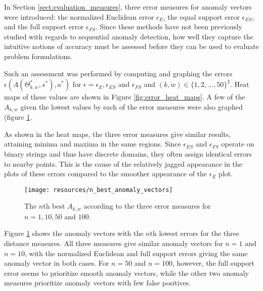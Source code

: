 In Section \ref{sect:evaluation_measures}, three error measures for anomaly vectors were introduced: the normalized Euclidean error $\epsilon_E$, the equal support error $\epsilon_{ES}$, and the full support error $\epsilon_{FS}$. Since these methods have not been previously studied with regards to sequential anomaly detection, how well they capture the intuitive notions of accuracy must be assessed before they can be used to evaluate problem formulations.

Such an assessment was performed by computing and graphing the errors $\epsilon(A(\Theta_{k, w}^*, s^*), a^*)$ for $\epsilon = \epsilon_E, \epsilon_{ES}$ and $\epsilon_{FS}$ and $(k, w) \in \{1,2,\dots,50\}^2$. Heat maps of these values are shown in Figure \ref{fig:error_heat_maps}. A few of the $A_{k, w}$ given the lowest values by each of the error measures were also graphed (figure \ref{fig:n_best_anomaly_vectors}.

As shown in the heat maps, the three error measures give similar results, attaining minima and maxima in the same regions. Since $\epsilon_{ES}$ and $\epsilon_{FS}$ operate on binary strings and thus have discrete domains, they often assign identical errors to nearby points. This is the cause of the relatively jagged appearance in the plots of these errors compared to the smoother appearance of the $\epsilon_{E}$ plot.

\begin{figure}[ht]
    \vspace{-5pt}
    \begin{center}
        \texttt{[image: resources/n\_best\_anomaly\_vectors]}
    \end{center}
    \vspace{-20pt}
    \caption{\small{The $n$th best $A_{k, w}$ according to the three error measures for $n = 1, 10, 50$ and $100$.}}
    \label{fig:n_best_anomaly_vectors}
    \vspace{-10pt}
\end{figure}

Figure \ref{fig:n_best_anomaly_vectors} shows the anomaly vectors with the $n$th lowest errors for the three distance measures. All three measures give similar anomaly vectors for $n = 1$ and $n = 10$, with the normalized Euclidean and full support errors giving the same anomaly vector in both cases. For $n = 50$ and $n = 100$, however, the full support error seems to prioritize smooth anomaly vectors, while the other two anomaly measures prioritize anomaly vectors with few false positives.

